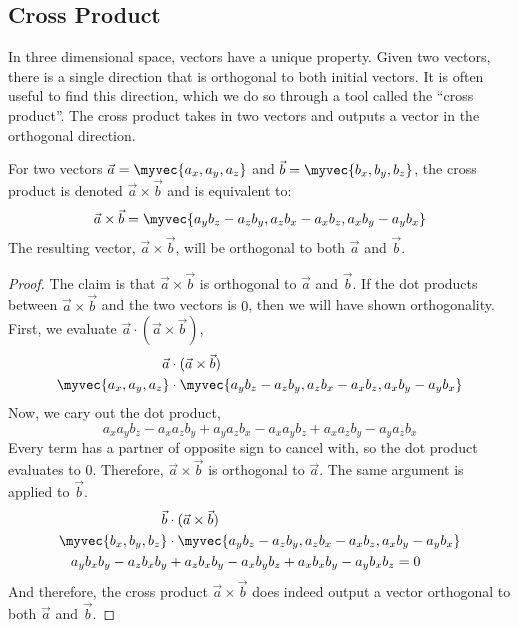 \documentclass[11pt]{article}
\newenvironment{mybox}
{\begin{tcolorbox}[colback=red!5!white,colframe=red!75!black]}
{\end{tcolorbox}}
\newtheorem{proof}{Proof}
\begin{document}
\subsection{Cross Product}
In three dimensional space, vectors have a unique property. Given two vectors, there is a single direction that is orthogonal to both initial vectors. It is often useful to find this direction, which we do so through a tool called the ``cross product''. The cross product takes in two vectors and outputs a vector in the orthogonal direction.
\begin{mybox}
    For two vectors $\vec{a}=\myvec{a_x,a_y,a_z}$ and $\vec{b}=\myvec{b_x,b_y,b_z}$, the cross product is denoted $\vec{a} \times \vec{b}$ and is equivalent to:
    \begin{equation*}
        \vec{a} \times \vec{b} = \myvec{a_yb_z-a_zb_y,a_zb_x-a_xb_z,a_xb_y-a_yb_x}
    \end{equation*}
    The resulting vector, $\vec{a} \times \vec{b}$, will be orthogonal to both $\vec{a}$ and $\vec{b}$.
\end{mybox}
\begin{proof}
    The claim is that $\vec{a} \times \vec{b}$ is orthogonal to $\vec{a}$ and $\vec{b}$. If the dot products between $\vec{a} \times \vec{b}$ and the two vectors is $0$, then we will have shown orthogonality. First, we evaluate $\vec{a} \cdot (\vec{a}\times\vec{b})$,
    \begin{align*}
        \vec{a} &\cdot (\vec{a}\times\vec{b})\\
        \myvec{a_x,a_y,a_z} &\cdot \myvec{a_yb_z-a_zb_y,a_zb_x-a_xb_z,a_xb_y-a_yb_x}
    \end{align*}
    Now, we cary out the dot product,
    \begin{equation*}
        a_xa_yb_z-a_xa_zb_y+a_ya_zb_x-a_xa_yb_z+a_xa_zb_y-a_ya_zb_x
    \end{equation*}
    Every term has a partner of opposite sign to cancel with, so the dot product evaluates to $0$. Therefore, $\vec{a}\times\vec{b}$ is orthogonal to $\vec{a}$. The same argument is applied to $\vec{b}$.
\begin{align*}
        \vec{b} &\cdot (\vec{a}\times\vec{b})\\
        \myvec{b_x,b_y,b_z} &\cdot \myvec{a_yb_z-a_zb_y,a_zb_x-a_xb_z,a_xb_y-a_yb_x}\\
        a_yb_xb_y-a_zb_xb_y&+a_zb_xb_y-a_xb_yb_z+a_xb_xb_y-a_yb_xb_z=0
\end{align*}
And therefore, the cross product $\vec{a}\times\vec{b}$ does indeed output a vector orthogonal to both $\vec{a}$ and $\vec{b}$.
\end{proof}
\end{document}
